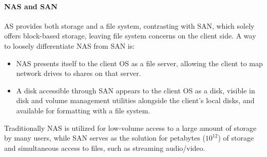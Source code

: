 \paragraph*{NAS and SAN}
AS provides both storage and a file system, contrasting with SAN, which solely offers block-based storage, leaving file system concerns on the client side. 
A way to loosely differentiate NAS from SAN is:
\begin{itemize}
    \item NAS presents itself to the client OS as a file server, allowing the client to map network drives to shares on that server.
    \item A disk accessible through SAN appears to the client OS as a disk, visible in disk and volume management utilities alongside the client's local disks, and available for formatting with a file system.
\end{itemize}
Traditionally NAS is utilized for low-volume access to a large amount of storage by many users, while SAN serves as the solution for petabytes ($10^{12}$) of storage and simultaneous access to files, such as streaming audio/video.

